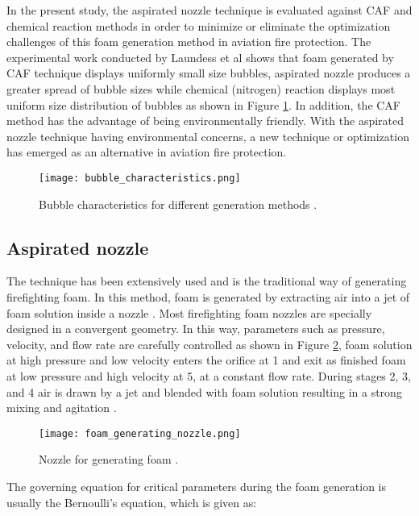In the present study, the aspirated nozzle technique is evaluated against CAF and chemical reaction methods in order to minimize or eliminate the optimization challenges of this foam generation method in aviation fire protection. The experimental work conducted by Laundess et al \cite{laundess2012suppression} shows that foam generated by CAF technique displays uniformly small size bubbles, aspirated nozzle produces a greater spread of bubble sizes while chemical (nitrogen) reaction displays most uniform size distribution of bubbles as shown in Figure \ref{ch2:figure:characteristics}. In addition, the CAF method has the advantage of being environmentally friendly.  With the aspirated nozzle technique having environmental concerns, a new technique or optimization has emerged as an alternative in aviation fire protection.

\begin{figure}[H]
    \centering
    \texttt{[image: bubble\_characteristics.png]}
    \caption{Bubble characteristics for different generation methods \cite{laundess2012suppression}.}
    \label{ch2:figure:characteristics}
\end{figure}

\subsection{Aspirated nozzle}
The technique has been extensively used and is the traditional way of generating firefighting foam. In this method, foam is generated by extracting air into a jet of foam solution inside a nozzle \cite{xi2017experimental}. Most firefighting foam nozzles are specially designed in a convergent geometry. In this way, parameters such as pressure, velocity, and flow rate are carefully controlled as shown in Figure \ref{ch2:figure:nozzle}, foam solution at high pressure and low velocity enters the orifice at 1 and exit as finished foam at low pressure and high velocity at 5, at a constant flow rate. During stages 2, 3, and 4 air is drawn by a jet and blended with foam solution resulting in a strong mixing and agitation \cite{csb2016phenomenological}.

\begin{figure}[H]
    \centering
    \texttt{[image: foam\_generating\_nozzle.png]}
    \caption{Nozzle for generating foam \cite{csb2016phenomenological}.}
    \label{ch2:figure:nozzle}
\end{figure}

The governing equation for critical parameters during the foam generation is usually the Bernoulli’s equation, which is given as:

